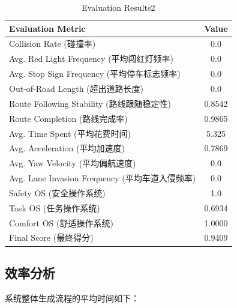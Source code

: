 \begin{table}[H]
	\centering
	\begin{tabular}{|l|c|}
		\hline
		\textbf{Evaluation Metric} & \textbf{Value} \\
		\hline
		Collision Rate (碰撞率) & 0.0 \\
		\hline
		Avg. Red Light Frequency (平均闯红灯频率) & 0.0 \\
		\hline
		Avg. Stop Sign Frequency (平均停车标志频率) & 0.0 \\
		\hline
		Out-of-Road Length (超出道路长度) & 0.0 \\
		\hline
		Route Following Stability (路线跟随稳定性) & 0.8542 \\
		\hline
		Route Completion (路线完成率) & 0.9865 \\
		\hline
		Avg. Time Spent (平均花费时间) & 5.325 \\
		\hline
		Avg. Acceleration (平均加速度) & 0.7869 \\
		\hline
		Avg. Yaw Velocity (平均偏航速度) & 0.0 \\
		\hline
		Avg. Lane Invasion Frequency (平均车道入侵频率) & 0.0 \\
		\hline
		Safety OS (安全操作系统) & 1.0 \\
		\hline
		Task OS (任务操作系统) & 0.6934 \\
		\hline
		Comfort OS (舒适操作系统) & 1.0000 \\
		\hline
		Final Score (最终得分) & 0.9409 \\
		\hline
	\end{tabular}
	\caption{Evaluation Results2}
	\label{tab:evaluation_results2}
\end{table}

\subsection{效率分析}
系统整体生成流程的平均时间如下：


